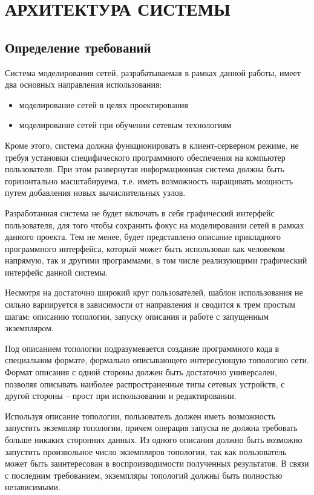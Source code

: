 \chapter{АРХИТЕКТУРА СИСТЕМЫ}

\section{Определение требований}

Система моделирования сетей, разрабатываемая в рамках данной работы, имеет два основных направления использования:
\begin{itemize}
    \item моделирование сетей в целях проектирования
    \item моделирование сетей при обучении сетевым технологиям
\end{itemize}
Кроме этого, система должна функционировать в клиент-серверном режиме, не требуя установки специфического программного
обеспечения на компьютер пользователя. При этом развернутая информационная система должна быть горизонтально масштабируема,
т.е. иметь возможность наращивать мощность путем добавления новых вычислительных узлов.

Разработанная система не будет включать в себя графический интерфейс пользователя, для того чтобы сохранить фокус на
моделировании сетей в рамках данного проекта. Тем не менее, будет представлено описание прикладного программного интерфейса,
который может быть использован как человеком напрямую, так и другими программами, в том числе реализующими графический 
интерфейс данной системы.

Несмотря на достаточно широкий круг пользователей, шаблон использования не сильно вариируется в зависимости от направления
и сводится к трем простым шагам: описанию топологии, запуску описания и работе с запущенным экземпляром. 

Под описанием  топологии подразумевается создание программного кода в специальном формате, формально описывающего 
интересующую топологию сети. Формат описания с одной стороны должен быть достаточно универсален, позволяя
описывать наиболее распространенные типы сетевых устройств, с другой стороны -- прост при использовании и редактировании.

Используя описание топологии, пользователь должен иметь возможность запустить экземпляр топологии, причем операция запуска
не должна требовать больше никаких сторонних данных. Из одного описания должно быть возможно запустить произвольное 
число экземпляров топологии, так как пользователь может быть заинтересован в воспроизводимости полученных результатов.
В связи с последним требованием, экземпляры топологий должны быть полностью независимыми.


